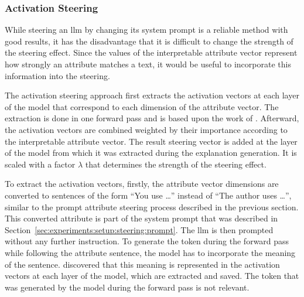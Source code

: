 
\subsubsection{Activation Steering}
\label{sec:experiments:setup:steering:activation}
While steering an \acs{llm} by changing its system prompt is a reliable method with good results, it has the disadvantage that it is difficult to change the strength of the steering effect. Since the values of the interpretable attribute vector represent how strongly an attribute matches a text, it would be useful to incorporate this information into the steering.

The activation steering approach first extracts the activation vectors at each layer of the model that correspond to each dimension of the attribute vector. The extraction is done in one forward pass and is based upon the work of \citet{konenStyleVectorsSteering2024}. %
Afterward, the activation vectors are combined weighted by their importance according to the interpretable attribute vector. The result steering vector is added at the layer of the model from which it was extracted during the explanation generation. It is scaled with a factor \(\lambda\) that determines the strength of the steering effect.

To extract the activation vectors, firstly, the attribute vector dimensions are converted to sentences of the form \enquote{You use \ldots} instead of \enquote{The author uses \ldots}, similar to the prompt attribute steering process described in the previous section. This converted attribute is part of the system prompt that was described in Section~\ref{sec:experiments:setup:steering:prompt}. The \ac{llm} is then prompted without any further instruction. To generate the token during the forward pass while following the attribute sentence, the model has to incorporate the meaning of the sentence. \citet{konenStyleVectorsSteering2024} discovered that this meaning is represented in the activation vectors at each layer of the model, which are extracted and saved. The token that was generated by the model during the forward pass is not relevant.

